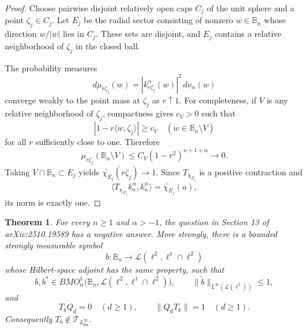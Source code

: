 \documentclass[11pt]{article}
\newtheorem{theorem}{Theorem}
\newcommand{\Bn}{\mathbb B_n}
\newcommand{\BMO}{BMO^1_\alpha}
\newcommand{\Tfin}{\mathcal T_{L^\infty_{\mathrm{fin}}}}
\newcommand{\cL}{\mathcal L}
\begin{document}
\begin{proof}
Choose pairwise disjoint relatively open caps $C_j$ of the unit sphere and a
point $\zeta_j\in C_j$.  Let $E_j$ be the radial sector consisting of nonzero
$w\in\Bn$ whose direction $w/|w|$ lies in $C_j$.  These sets are disjoint,
and $E_j$ contains a relative neighborhood of $\zeta_j$ in the closed ball.

The probability measures
\[
 d\mu_{r\zeta_j}(w)=|k_{r\zeta_j}^\alpha(w)|^2\,d\nu_\alpha(w)
\]
converge weakly to the point mass at $\zeta_j$ as $r\uparrow1$.  For
completeness, if $V$ is any relative neighborhood of $\zeta_j$, compactness
gives $c_V>0$ such that
\[
 |1-r\langle w,\zeta_j\rangle|\geq c_V
 \quad(w\in\overline{\Bn}\setminus V)
\]
for all $r$ sufficiently close to one.  Therefore
\[
 \mu_{r\zeta_j}(\Bn\setminus V)
 \leq C_V(1-r^2)^{n+1+\alpha}\longrightarrow0.
\]
Taking $V\cap\Bn\subset E_j$ yields
$\widetilde{\chi_{E_j}}(r\zeta_j)\to1$.  Since $T_{\chi_{E_j}}$ is a positive
contraction and
\[
 \big\langle T_{\chi_{E_j}}k_a^\alpha,k_a^\alpha\big\rangle
 =\widetilde{\chi_{E_j}}(a),
\]
its norm is exactly one.
\end{proof}

\begin{theorem}\label{thm:main}
For every $n\geq1$ and $\alpha>-1$, the question in Section 13 of
arXiv:2510.19589 has a negative answer.  More strongly, there is a bounded
strongly measurable symbol
\[
 b:\Bn\to\cL(\ell^2,\ell^1\cap\ell^2)
\]
whose Hilbert-space adjoint has the same property, such that
\[
 b,b^*\in\BMO\bigl(\Bn,\cL(\ell^2,\ell^1\cap\ell^2)\bigr),
 \qquad
 \|\widetilde b\|_{L^\infty(\cL(\ell^2))}\leq1,
\]
and
\[
 T_bQ_d=0\quad(d\geq1),
 \qquad
 \|Q_dT_b\|=1\quad(d\geq1).
\]
Consequently $T_b\notin\Tfin$.
\end{theorem}
\end{document}
